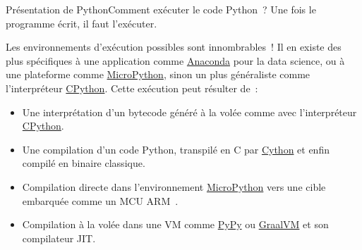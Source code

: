 \documentclass{beamer}
\begin{document}
    \begin{frame}{Présentation de Python}{Comment exécuter le code Python~?}
        Une fois le programme écrit, il faut l'exécuter.

        Les environnements d'exécution possibles sont innombrables~!
        Il en existe des plus spécifiques à une application comme \href{https://www.anaconda.com/}{Anaconda} pour la data science, ou à une plateforme comme \href{https://micropython.org/}{MicroPython}, sinon un plus généraliste comme l'interpréteur \href{https://github.com/python/cpython}{CPython}.
        \bigbreak
        Cette exécution peut résulter de~:
        \begin{itemize}
            \item Une interprétation d'un bytecode généré à la volée comme avec l'interpréteur \href{https://github.com/python/cpython}{CPython}.
            \item Une compilation d'un code Python, transpilé en C par \href{https://cython.org/}{Cython} et enfin compilé en binaire classique.
            \item Compilation directe dans l'environnement \href{https://micropython.org/}{MicroPython} vers une cible embarquée comme un MCU ARM~.
            \item Compilation à la volée dans une VM comme \href{https://pypy.org/}{PyPy} ou \href{https://www.graalvm.org/python/}{GraalVM} et son compilateur JIT.
        \end{itemize}
    \end{frame}
\end{document}

